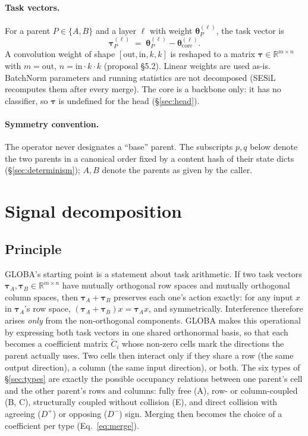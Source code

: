 \documentclass[11pt,a4paper]{article}
\newcommand{\tauv}{\boldsymbol{\tau}}
\newcommand{\thetav}{\boldsymbol{\theta}}
\newcommand{\Ct}{\tilde{C}}
\newcommand{\Dp}{D^{+}}
\newcommand{\Dm}{D^{-}}
\begin{document}
\paragraph{Task vectors.} For a parent $P\in\{A,B\}$ and a layer $\ell$ with weight $\thetav_P^{(\ell)}$, the task vector is
\begin{equation}
\tauv_P^{(\ell)} \;=\; \thetav_P^{(\ell)} - \thetav_{\mathrm{core}}^{(\ell)} .
\label{eq:tau}
\end{equation}
A convolution weight of shape $[\mathrm{out},\mathrm{in},k,k]$ is reshaped to a matrix $\tauv\in\mathbb{R}^{m\times n}$ with $m=\mathrm{out}$, $n=\mathrm{in}\cdot k\cdot k$ (proposal \S5.2). Linear weights are used as-is. BatchNorm parameters and running statistics are not decomposed (SESiL recomputes them after every merge). The core is a backbone only: it has no classifier, so $\tauv$ is undefined for the head (\S\ref{sec:head}).

\paragraph{Symmetry convention.} The operator never designates a ``base'' parent. The subscripts $p,q$ below denote the two parents in a canonical order fixed by a content hash of their state dicts (\S\ref{sec:determinism}); $A,B$ denote the parents as given by the caller.

\section{Signal decomposition}
\label{sec:decomp}

\subsection{Principle}
GLOBA's starting point is a statement about task arithmetic. If two task vectors $\tauv_A,\tauv_B\in\mathbb{R}^{m\times n}$ have mutually orthogonal row spaces and mutually orthogonal column spaces, then $\tauv_A+\tauv_B$ preserves each one's action exactly: for any input $x$ in $\tauv_A$'s row space, $(\tauv_A+\tauv_B)x=\tauv_A x$, and symmetrically. Interference therefore arises \emph{only} from the non-orthogonal components. GLOBA makes this operational by expressing both task vectors in one shared orthonormal basis, so that each becomes a coefficient matrix $\Ct_i$ whose non-zero cells mark the directions the parent actually uses. Two cells then interact only if they share a row (the same output direction), a column (the same input direction), or both. The six types of \S\ref{sec:types} are exactly the possible occupancy relations between one parent's cell and the other parent's rows and columns: fully free (A), row- or column-coupled (B, C), structurally coupled without collision (E), and direct collision with agreeing ($\Dp$) or opposing ($\Dm$) sign. Merging then becomes the choice of a coefficient per type (Eq.~\ref{eq:merge}).
\end{document}
